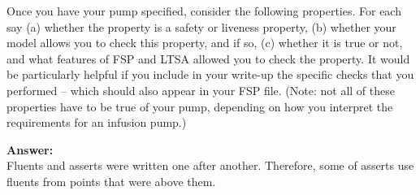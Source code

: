 \documentclass{article}
\begin{document}
Once you have your pump specified, consider the following properties. For each say (a) whether the property
is a safety or liveness property,  (b) whether your model allows you to check this property, and if
so, (c) whether it is true or not, and what features of FSP and LTSA allowed you to check the
property. It would be particularly helpful if you include in your write-up the specific checks that you performed -- which should also appear in your FSP file. (Note: not all of these properties have to be true of your pump, depending on how you interpret the requirements for an infusion pump.)

\textbf{Answer: } 
\\Fluents and asserts were written one after another. Therefore, some of asserts use fluents from points that were above them.
\end{document}
